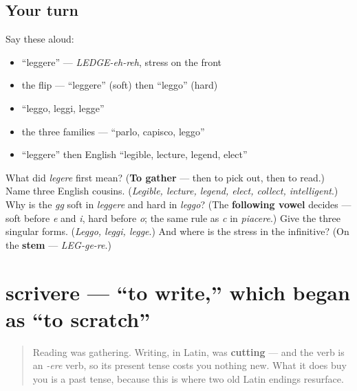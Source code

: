 \subsection*{Your turn}
Say these aloud:

\begin{itemize}
\raggedright
  \item \textquotedblleft{}leggere\textquotedblright{} — \emph{LEDGE-eh-reh}, stress on the front
  \item the flip — \textquotedblleft{}leggere\textquotedblright{} (soft) then \textquotedblleft{}leggo\textquotedblright{} (hard)
  \item \textquotedblleft{}leggo, leggi, legge\textquotedblright{}
  \item the three families — \textquotedblleft{}parlo, capisco, leggo\textquotedblright{}
  \item \textquotedblleft{}leggere\textquotedblright{} then English \textquotedblleft{}legible, lecture, legend, elect\textquotedblright{}
\end{itemize}

\begin{tcolorbox}[breakable,colback=teal!4,colframe=teal!35!black,title={Before you move on}]
What did \emph{legere} first mean? (\textbf{To gather} — then to pick out, then to read.) Name three English cousins. (\emph{Legible, lecture, legend, elect, collect, intelligent}.) Why is the \emph{gg} soft in \emph{leggere} and hard in \emph{leggo}? (The \textbf{following vowel} decides — soft before \emph{e} and \emph{i}, hard before \emph{o}; the same rule as \emph{c} in \emph{piacere}.) Give the three singular forms. (\emph{Leggo, leggi, legge}.) And where is the stress in the infinitive? (On the \textbf{stem} — \emph{LEG-ge-re}.)
\end{tcolorbox}
\section[scrivere]{scrivere — \textquotedblleft{}to write,\textquotedblright{} which began as \textquotedblleft{}to scratch\textquotedblright{}}

\label{lesson:IT-C18-scrivere}



\begin{quote}
Reading was gathering. Writing, in Latin, was \textbf{cutting} — and the verb is an \emph{-ere} verb, so its present tense costs you nothing new. What it does buy you is a past tense, because this is where two old Latin endings resurface.
\end{quote}

